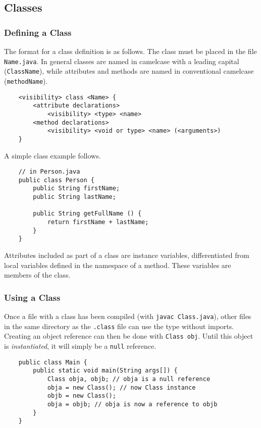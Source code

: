 \documentclass[12pt]{report}
\newcommand{\code}[1]{\lstinline{#1}}
\begin{document}
\begin{flushleft}
\subsection*{Classes}
\subsubsection*{Defining a Class}

The format for a class definition is as follows. The class must be placed in
the file \code{Name.java}. In general classes are named in camelcase with a
leading capital (\code{ClassName}), while attributes and methods are named in 
conventional camelcase (\code{methodName}).
\begin{lstlisting}
    <visibility> class <Name> {
        <attribute declarations>
            <visibility> <type> <name>
        <method declarations>
            <visibility> <void or type> <name> (<arguments>)
    }
\end{lstlisting}
A simple class example follows.
\begin{lstlisting}
    // in Person.java
    public class Person {
        public String firstName;
        public String lastName;

        public String getFullName () {
            return firstName + lastName;
        }
    }
\end{lstlisting}
Attributes included as part of a class are instance variables, differentiated
from local variables defined in the namespace of a method. These variables are
members of the class.

\subsubsection*{Using a Class}

Once a file with a class has been compiled (with \code{javac Class.java}),
other files in the same directory as the \code{.class} file can use the type
without imports. Creating an object reference can then be done with 
\code{Class obj}. Until this object is \textit{instantiated}, it will simply be
a \code{null} reference.

\begin{lstlisting}
    public class Main {
        public static void main(String args[]) {
            Class obja, objb; // obja is a null reference
            obja = new Class(); // now Class instance
            objb = new Class();
            obja = objb; // obja is now a reference to objb
        }
    }
\end{lstlisting}


\end{flushleft}
\end{document}
